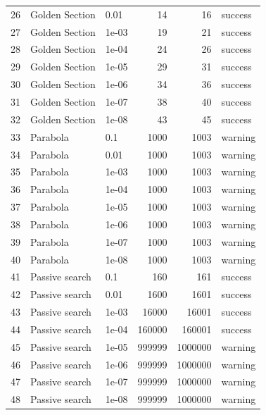 \begin{longtable}{rllrrl}
26 & Golden Section & 0.01 & 14 & 16 & success \\
27 & Golden Section & 1e-03 & 19 & 21 & success \\
28 & Golden Section & 1e-04 & 24 & 26 & success \\
29 & Golden Section & 1e-05 & 29 & 31 & success \\
30 & Golden Section & 1e-06 & 34 & 36 & success \\
31 & Golden Section & 1e-07 & 38 & 40 & success \\
32 & Golden Section & 1e-08 & 43 & 45 & success \\
33 & Parabola & 0.1 & 1000 & 1003 & warning \\
34 & Parabola & 0.01 & 1000 & 1003 & warning \\
35 & Parabola & 1e-03 & 1000 & 1003 & warning \\
36 & Parabola & 1e-04 & 1000 & 1003 & warning \\
37 & Parabola & 1e-05 & 1000 & 1003 & warning \\
38 & Parabola & 1e-06 & 1000 & 1003 & warning \\
39 & Parabola & 1e-07 & 1000 & 1003 & warning \\
40 & Parabola & 1e-08 & 1000 & 1003 & warning \\
41 & Passive search & 0.1 & 160 & 161 & success \\
42 & Passive search & 0.01 & 1600 & 1601 & success \\
43 & Passive search & 1e-03 & 16000 & 16001 & success \\
44 & Passive search & 1e-04 & 160000 & 160001 & success \\
45 & Passive search & 1e-05 & 999999 & 1000000 & warning \\
46 & Passive search & 1e-06 & 999999 & 1000000 & warning \\
47 & Passive search & 1e-07 & 999999 & 1000000 & warning \\
48 & Passive search & 1e-08 & 999999 & 1000000 & warning \\
\end{longtable}
